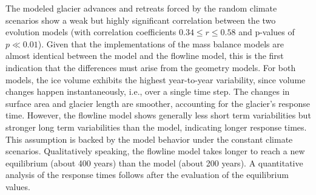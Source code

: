         The modeled glacier advances and retreats forced by the random climate scenarios show a weak but highly significant correlation between the two evolution models (with correlation coefficients $0.34 \leq r \leq 0.58$ and p-values of $p \ll 0.01$). Given that the implementations of the mass balance models are almost identical between the \vas{} model and the flowline model, this is the first indication that the differences must arise from the geometry models. For both models, the ice volume exhibits the highest year-to-year variability, since volume changes happen instantaneously, i.e., over a single time step. The changes in surface area and glacier length are smoother, accounting for the glacier's response time. However, the flowline model shows generally less short term variabilities but stronger long term variabilities than the \vas{} model, indicating longer response times. This assumption is backed by the model behavior under the constant climate scenarios. Qualitatively speaking, the flowline model takes longer to reach a new equilibrium (about 400 years) than the \vas{} model (about 200 years). A quantitative analysis of the response times follows after the evaluation of the equilibrium values. 


